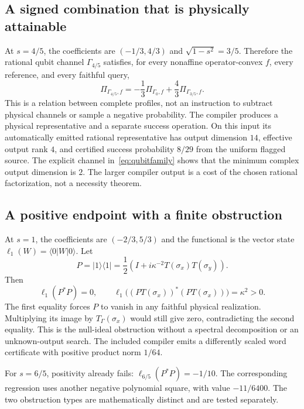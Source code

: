 \documentclass[11pt,a4paper]{article}
\theoremstyle{definition}\newtheorem{definition}[theorem]{Definition}
\begin{document}
\subsection{A signed combination that is physically attainable}

At $s=4/5$, the coefficients are $(-1/3,4/3)$ and $\sqrt{1-s^2}=3/5$. Therefore the rational qubit channel $\Gamma_{4/5}$ satisfies, for every nonaffine operator-convex $f$, every reference, and every faithful query,
\begin{equation}\label{eq:qubitrelation}
 \Pi_{\Gamma_{4/5},f}
 =-\frac13\Pi_{\Gamma_0,f}+\frac43\Pi_{\Gamma_{3/5},f}.
\end{equation}
This is a relation between complete profiles, not an instruction to subtract physical channels or sample a negative probability. The compiler produces a physical representative and a separate success operation. On this input its automatically emitted rational representative has output dimension $14$, effective output rank $4$, and certified success probability $8/29$ from the uniform flagged source. The explicit channel in~\eqref{eq:qubitfamily} shows that the minimum complex output dimension is $2$. The larger compiler output is a cost of the chosen rational factorization, not a necessity theorem.

\subsection{A positive endpoint with a finite obstruction}

At $s=1$, the coefficients are $(-2/3,5/3)$ and the functional is the vector state $\ell_1(W)=\langle0|W|0\rangle$. Let
\[
 P=|1\rangle\langle1|=
 \frac12\left(I+i\kappa^{-2}T(\sigma_x)T(\sigma_y)\right).
\]
Then
\begin{equation}\label{eq:boundaryobstruction}
 \ell_1(P^*P)=0,
 \qquad
 \ell_1\big((PT(\sigma_x))^*(PT(\sigma_x))\big)=\kappa^2>0.
\end{equation}
The first equality forces $P$ to vanish in any faithful physical realization. Multiplying its image by $T_\Gamma(\sigma_x)$ would still give zero, contradicting the second equality. This is the null-ideal obstruction without a spectral decomposition or an unknown-output search. The included compiler emits a differently scaled word certificate with positive product norm $1/64$.

For $s=6/5$, positivity already fails: $\ell_{6/5}(P^*P)=-1/10$. The corresponding regression uses another negative polynomial square, with value $-11/6400$. The two obstruction types are mathematically distinct and are tested separately.
\end{document}
